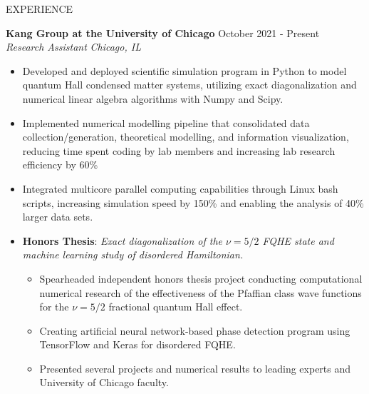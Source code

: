 \documentclass{resume} %
\begin{document}
\vspace{-0.5em}
\begin{rSection}{EXPERIENCE}

\textbf{Kang Group at the University of Chicago} \hfill October 2021 - Present\\
\textit{Research Assistant} \hfill \textit{Chicago, IL}
\vspace{-0.6em}
 \begin{itemize}
   \itemsep -5.8pt {}
   \item Developed and deployed scientific simulation program in Python to model quantum Hall condensed matter systems, utilizing exact diagonalization and numerical linear algebra algorithms with Numpy and Scipy.
   \item Implemented numerical modelling pipeline that consolidated data collection/generation, theoretical modelling, and information visualization, reducing time spent coding by lab members and increasing lab research efficiency by 60\% 
   \item Integrated multicore parallel computing capabilities through Linux bash scripts, increasing simulation speed by 150\% and enabling the analysis of 40\% larger data sets.
   \item \textbf{Honors Thesis}: \textit{Exact diagonalization of the $\nu=5/2$ FQHE state and machine learning study of disordered Hamiltonian.}
   \begin{itemize}
      \vspace{-0.6em}
      \itemsep -5.8pt {}
      \item Spearheaded independent honors thesis project conducting computational numerical research of the effectiveness of the Pfaffian class wave functions for the $\nu=5/2$ fractional quantum Hall effect.
      \item Creating artificial neural network-based phase detection program using TensorFlow and Keras for disordered FQHE.
      \item Presented several projects and numerical results to leading experts and University of Chicago faculty.
       
   \end{itemize}


 \end{itemize}
 

\end{rSection}
\end{document}
